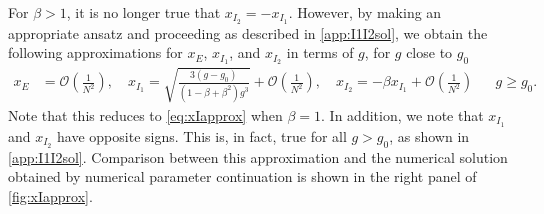 \documentclass[reqno]{siamonline190516}
\begin{document}
For $\beta > 1$, it is no longer true that $x_{I_2} = -x_{I_1}$. However, by making an appropriate ansatz and proceeding as described in \cref{app:I1I2sol}, we obtain the following approximations for $x_E$, $x_{I_1}$, and $x_{I_2}$ in terms of $g$, for $g$ close to $g_0$
\begin{align}\label{eq:XI1}
 x_E &= \mathcal{O}\left( \frac{1}{N^2}\right), \quad
 x_{I_1} = \sqrt{ \frac{ 3(g - g_0) }{ (1 - \beta + \beta^2 )g^3}} + \mathcal{O}\left( \frac{1}{N^2}\right), \quad
 x_{I_2} = -\beta x_{I_1} +  \mathcal{O}\left( \frac{1}{N^2}\right) && g \geq g_0.
\end{align}
Note that this reduces to \cref{eq:xIapprox} when $\beta = 1$. In addition, we note that $x_{I_1}$ and $x_{I_2}$ have opposite signs. This is, in fact, true for all $g > g_0$, as shown in \cref{app:I1I2sol}. Comparison between this approximation and the numerical solution obtained by numerical parameter continuation is shown in the right panel of \cref{fig:xIapprox}.
\end{document}
